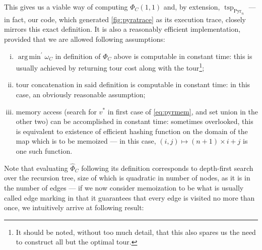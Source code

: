 \documentclass[titlepage,twoside,index=totoc,bibliography=totoc]{scrartcl}
\DeclareMathOperator*{\argmin}{arg\,min}
\numberwithin{equation}{section}
\numberwithin{figure}{section}
\numberwithin{table}{section}
\begin{document}
\begin{remark}
\label{rem:timeass}
This gives us a viable way of computing $\Phi_C\left(1,1\right)$ and, by extension,
$\operatorname{tsp}_{\operatorname{Pyr}_n}$ --- in fact, our code, which
generated \cref{fig:pyratrace} as its execution trace, closely mirrors this exact
definition.
It is also a reasonably efficient implementation, provided that we are
allowed following assumptions:
  \begin{enumerate}[(i)]
    \item
      $\argmin^\prime \omega_C$ in definition of $\Phi_C$ above is computable in constant time:
      this is usually achieved by returning tour cost along with the
      tour\footnote{%
        It should be noted, without too much detail, that this also spares
        us the need to construct all but the optimal tour.
      };
    \item
      tour concatenation in said definition is computable in constant time:
      in this case, an obviously reasonable assumption;
    \item
      memory access (search for $v^\ast$ in first case of \eqref{eq:pyrmem},
      and set union in the other two) can be accomplished in constant time:
      sometimes overlooked, this is equivalent to existence of efficient hashing
      function on the domain of the map which is to be memoized ---
      in this case, $(i,j) \mapsto (n+1)\times i + j$ is one such function.
  \end{enumerate}
\end{remark}

Note that evaluating $\widehat{\Phi}_C$ following its definition corresponds to
depth-first search over the recursion tree, size of which is quadratic in number of nodes,
as it is in the number of edges --- if we now consider memoization to be what
is usually called edge marking in that it guarantees that every edge
is visited no more than once, we intuitively arrive at following result:
\end{document}
